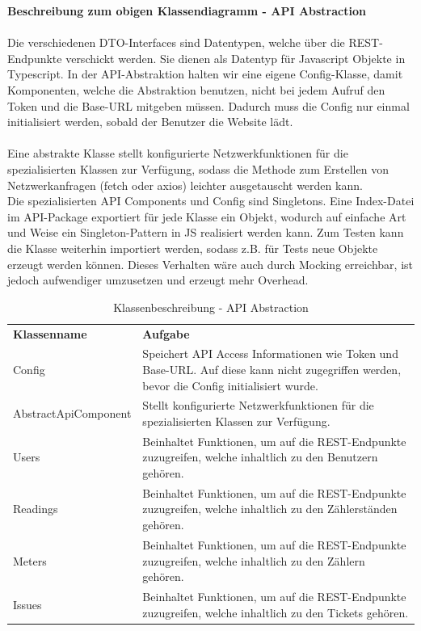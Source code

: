 \noindent \textbf{Beschreibung zum obigen Klassendiagramm - API Abstraction} \\ \\
Die verschiedenen DTO-Interfaces sind Datentypen, welche über die REST-Endpunkte verschickt werden. Sie dienen als Datentyp für Javascript Objekte in Typescript. In der API-Abstraktion halten wir eine eigene Config-Klasse, damit Komponenten, welche die Abstraktion benutzen, nicht bei jedem Aufruf den Token und die Base-URL mitgeben müssen. Dadurch muss die Config nur einmal initialisiert werden, sobald der Benutzer die Website lädt. \\\\
Eine abstrakte Klasse stellt konfigurierte Netzwerkfunktionen für die spezialisierten Klassen zur Verfügung, sodass die Methode zum Erstellen von Netzwerkanfragen (fetch oder axios) leichter ausgetauscht werden kann. \\
Die spezialisierten API Components und Config sind Singletons. Eine Index-Datei im API-Package exportiert für jede Klasse ein Objekt, wodurch auf einfache Art und Weise ein Singleton-Pattern in JS realisiert werden kann.
Zum Testen kann die Klasse weiterhin importiert werden, sodass z.B. für Tests neue Objekte erzeugt werden können. Dieses Verhalten wäre auch durch Mocking erreichbar, ist jedoch aufwendiger umzusetzen und erzeugt mehr Overhead. \\

\begin{table}[H]
	\centering
	\begin{tabularx}{\textwidth}{X X}
		\rowcolor[HTML]{C0C0C0} 
		\textbf{Klassenname} & \textbf{Aufgabe} \\
		Config& Speichert API Access Informationen wie Token und Base-URL. Auf diese kann nicht zugegriffen werden, bevor die Config initialisiert wurde.  \\
		\rowcolor[HTML]{E7E7E7} 
		AbstractApiComponent & Stellt konfigurierte Netzwerkfunktionen für die spezialisierten Klassen zur Verfügung. \\
		Users & Beinhaltet Funktionen, um auf die REST-Endpunkte zuzugreifen, welche inhaltlich zu den Benutzern gehören. \\
		\rowcolor[HTML]{E7E7E7} 
		Readings & Beinhaltet Funktionen, um auf die REST-Endpunkte zuzugreifen, welche inhaltlich zu den Zählerständen gehören. \\
		Meters & Beinhaltet Funktionen, um auf die REST-Endpunkte zuzugreifen, welche inhaltlich zu den Zählern gehören. \\
		\rowcolor[HTML]{E7E7E7} 
		Issues & Beinhaltet Funktionen, um auf die REST-Endpunkte zuzugreifen, welche inhaltlich zu den Tickets gehören. \\
	\end{tabularx}
	\caption{Klassenbeschreibung - API Abstraction}
	\label{table:klassenbeschreibung-api Abstraction}
\end{table}


